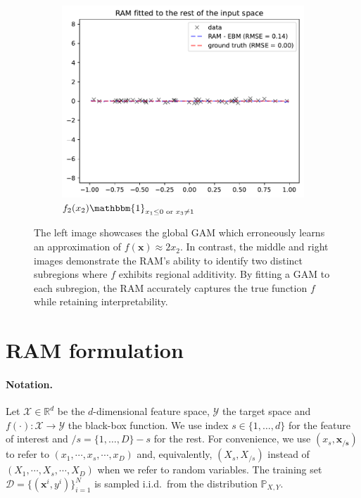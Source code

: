 \documentclass[runningheads]{llncs}
\newcommand{\Rd}{\mathbb{R}^d}
\newcommand{\xb}{\mathbf{x}}
\newcommand{\xcc}{\mathbf{x_{/s}}}
\newcommand{\Xcal}{\mathcal{X}}
\newcommand{\Ycal}{\mathcal{Y}}
\newcommand{\when}[1]{\mathbbm{1}_{#1}}
\begin{document}
\begin{figure}[htbp]
\begin{subfigure}{0.32\textwidth}
    \end{subfigure}
    \begin{subfigure}{0.32\textwidth}
        \centering
        \includegraphics[width=\textwidth]{figures/regional_gam_subreg_2}
        \caption{\(f_2(x_2) \when{x_1 \leq 0 \text{ or } x_3 \neq 1}\)}
        \label{subfig:regional_gam_2}
    \end{subfigure}
    \caption{The left image showcases the global GAM which erroneously learns an approximation of \(f(\xb) \approx 2x_2\).
    In contrast, the middle and right images demonstrate the RAM's ability to identify two distinct subregions where \(f\) exhibits regional additivity.
    By fitting a GAM to each subregion, the RAM accurately captures the true function $f$ while retaining interpretability.}
    \label{fig:ram_example}
\end{figure}

\section{RAM formulation}
\label{sec:ram_formulation}

\paragraph{Notation.}
Let \(\Xcal \in \Rd\) be the \(d\)-dimensional feature space, \(\Ycal\) the target space and \(f(\cdot) : \Xcal \rightarrow \Ycal\) the black-box function.
We use index \(s \in \{1, \ldots, d\}\) for the feature of interest and \(/s = \{1, \ldots, D\} - s\) for the rest.
For convenience, we use \((x_s, \xcc)\) to refer to \((x_1, \cdots , x_s, \cdots, x_D)\) and, equivalently, \((X_s, X_{/s})\) instead of \((X_1, \cdots , X_s, \cdots, X_D)\) when we refer to random variables.
The training set \(\mathcal{D} = \{(\xb^i, y^i)\}_{i=1}^N\) is sampled
i.i.d.\ from the distribution \(\mathbb{P}_{X,Y}\).
\end{document}
